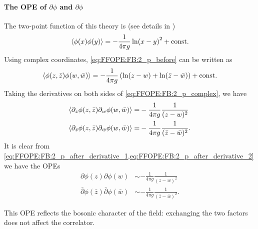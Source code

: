 \documentclass[10pt]{article}
\begin{document}
\paragraph{The OPE of $\partial\phi$ and $\partial\phi$}
The two-point function of this theory is (see details in \cite[Section 2.3]{DiFrancesco:1997nk})
\begin{align}
    \expval{\phi(x)\phi(y)}=-\frac{1}{4\pi g}\ln(x-y)^2+\text{const.}\label{eq:FFOPE:FB:2_p_before}
\end{align}
Using complex coordinates, \cref{eq:FFOPE:FB:2_p_before} can be written as
\begin{align}
    \expval{\phi(z,\bar{z})\phi(w,\bar{w})}=-\frac{1}{4\pi g}\left(\ln(z-w)+\ln(\bar{z}-\bar{w})\right)+\text{const.}\label{eq:FFOPE:FB:2_p_complex}
\end{align}
Taking the derivatives on both sides of \cref{eq:FFOPE:FB:2_p_complex}, we have
\begin{subequations}
    \begin{align}
        \expval{\partial_z\phi(z,\bar{z})\partial_w\phi(w,\bar{w})}=                 & -\frac{1}{4\pi g}\frac{1}{(z-w)^2}\label{eq:FFOPE:FB:2_p_after_derivative_1}              \\
        \expval{\partial_{\bar{z}}\phi(z,\bar{z})\partial_{\bar{w}}\phi(w,\bar{w})}= & -\frac{1}{4\pi g}\frac{1}{(\bar{z}-\bar{w})^2}.\label{eq:FFOPE:FB:2_p_after_derivative_2}
    \end{align}
\end{subequations}
It is clear from \cref{eq:FFOPE:FB:2_p_after_derivative_1,eq:FFOPE:FB:2_p_after_derivative_2} we have the OPEs
\begin{subequations}
    \begin{align}
        \partial\phi(z)\partial\phi(w)                         & \sim-\frac{1}{4\pi g}\frac{1}{(z-w)^2}\label{eq:2dcft:boson_OPE:partial_phi_partial_phi_final} \\
        \bar{\partial}\phi(\bar{z})\bar{\partial}\phi(\bar{w}) & \sim-\frac{1}{4\pi g}\frac{1}{(\bar{z}-\bar{w})^2}.
    \end{align}
\end{subequations}
\begin{remark}
    This OPE reflects the bosonic character of the field: exchanging the two factors does not affect the correlator.
\end{remark}
\end{document}
